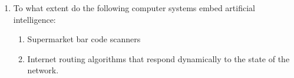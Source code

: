 \documentclass[11pt]{article}
\newcommand{\question}[1]{#1}
\newcommand{\answer}[1]{}
\begin{document}
\begin{enumerate}
\begin{enumerate}
\item 
  \question{To what extent do the following computer systems embed artificial intelligence:
  \begin{enumerate}
  \item Supermarket bar code scanners
  \item Internet routing algorithms that respond dynamically to the state of the network.
  \end{enumerate}}
  \answer{\begin{enumerate}
  \item Although bar code scanning is in a sense computer vision, these are not AI systems. The problem of reading a bar code is an extremely limited and artificial form of visual interpretation, and it has been carefully designed to be as simple as possible, given the hardware.
  \item This is borderline. There is something to be said for viewing these as intelligent agents
working in cyberspace. The task is sophisticated, the information available is partial, the
techniques are heuristic (not guaranteed optimal), and the state of the world is dynamic.
All of these are characteristic of intelligent activities. On the other hand, the task is very
far from those normally carried out in human cognition.
  \end{enumerate}
}


\end{enumerate}
\end{enumerate}
\end{document}

